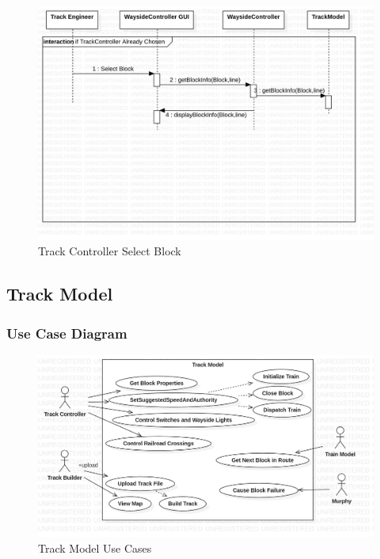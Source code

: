 \documentclass{article}
\begin{document}
    \begin{figure}[H]
        \centering
        \includegraphics[width=\textwidth]{./SequenceDiagrams/TrackController_SelectBlock.png}
        \caption{Track Controller Select Block}
        \label{fig: Use Case: Track Controller Select Block}
    \end{figure}

    \subsection{Track Model}
    
    \subsubsection{Use Case Diagram}
    \begin{figure}[H]
        \centering
        \includegraphics[width=\textwidth]{./UseCaseDiagrams/TrackModel_UseCaseDiagram_Pic.png}
        \caption{Track Model Use Cases}
        \label{fig:Track Model Use Cases}
    \end{figure}
    
\end{document}
